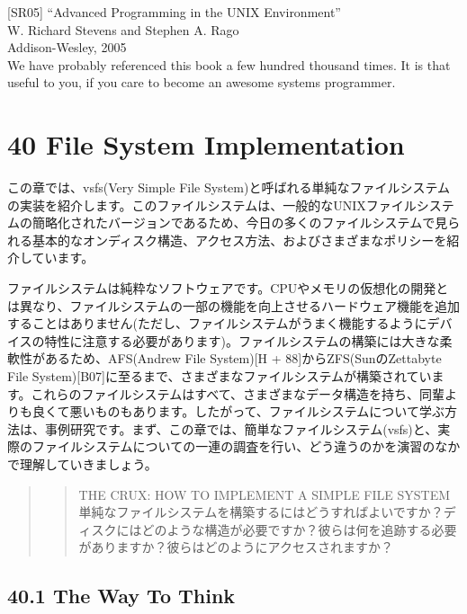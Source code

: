 {[}SR05{]} ``Advanced Programming in the UNIX Environment''\\
W. Richard Stevens and Stephen A. Rago\\
Addison-Wesley, 2005\\
We have probably referenced this book a few hundred thousand times. It
is that useful to you, if you care to become an awesome systems
programmer.

\hypertarget{file-system-implementation}{%
\section*{40 File System
Implementation}\label{file-system-implementation}}

この章では、vsfs(Very Simple File
System)と呼ばれる単純なファイルシステムの実装を紹介します。このファイルシステムは、一般的なUNIXファイルシステムの簡略化されたバージョンであるため、今日の多くのファイルシステムで見られる基本的なオンディスク構造、アクセス方法、およびさまざまなポリシーを紹介しています。

ファイルシステムは純粋なソフトウェアです。CPUやメモリの仮想化の開発とは異なり、ファイルシステムの一部の機能を向上させるハードウェア機能を追加することはありません(ただし、ファイルシステムがうまく機能するようにデバイスの特性に注意する必要があります)。ファイルシステムの構築には大きな柔軟性があるため、AFS(Andrew
File System){[}H + 88{]}からZFS(SunのZettabyte File
System){[}B07{]}に至るまで、さまざまなファイルシステムが構築されています。これらのファイルシステムはすべて、さまざまなデータ構造を持ち、同輩よりも良くて悪いものもあります。したがって、ファイルシステムについて学ぶ方法は、事例研究です。まず、この章では、簡単なファイルシステム(vsfs)と、実際のファイルシステムについての一連の調査を行い、どう違うのかを演習のなかで理解していきましょう。

\begin{quote}
\begin{quote}
THE CRUX: HOW TO IMPLEMENT A SIMPLE FILE SYSTEM\\
単純なファイルシステムを構築するにはどうすればよいですか？ディスクにはどのような構造が必要ですか？彼らは何を追跡する必要がありますか？彼らはどのようにアクセスされますか？
\end{quote}
\end{quote}

\hypertarget{the-way-to-think}{%
\subsection*{40.1 The Way To Think}\label{the-way-to-think}}

